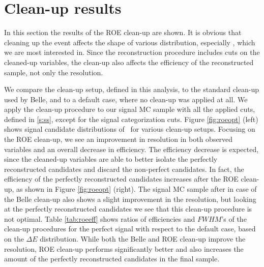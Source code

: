 
\section{Clean-up results}

In this section the results of the ROE clean-up are shown. It is obvious that cleaning up the event affects the shape of various distribution, especially \vars, which we are most interested in. Since the reconstruction procedure includes cuts on the cleaned-up variables, the clean-up also affects the efficiency of the reconstructed sample, not only the resolution. 

We compare the clean-up setup, defined in this analysis, to the standard clean-up used by Belle, and to a default case, where no clean-up was applied at all. We apply the clean-up procedure to our signal MC sample with all the applied cuts, defined in \ref{s:ss}, except for the signal categorization cuts. Figure \ref{fig:roeopt} (left) shows signal candidate distributions of \vars~for various clean-up setups. Focusing on the ROE clean-up, we see an improvement in resolution in both observed variables and an overall decrease in efficiency. The efficiency decrease is expected, since the cleaned-up variables are able to better isolate the perfectly reconstructed candidates and discard the non-perfect candidates. In fact, the efficiency of the perfectly reconstructed candidates increases after the ROE clean-up, as shown in Figure \ref{fig:roeopt} (right). The signal MC sample after in case of the Belle clean-up also shows a slight improvement in the resolution, but looking at the perfectly reconstructed candidates we see that this clean-up procedure is not optimal. Table \ref{tab:roeeff} shows ratios of efficiencies and $FWHM$'s of the clean-up procedures for the perfect signal with respect to the default case, based on the $\Delta E$ distribution. While both the Belle and ROE clean-up improve the resolution, ROE clean-up performs significantly better and also increases the amount of the perfectly reconstructed candidates in the final sample.

